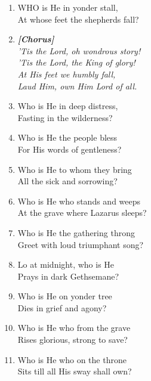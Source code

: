 \documentclass[11pt,a4paper]{article}
\begin{document}
\begin{enumerate}
    \item WHO is He in yonder stall, \\
        At whose feet the shepherds fall?

    \item[] \vspace{0.4em}
    \textbf{\textit{[Chorus]}} \\
    \textit{'Tis the Lord, oh wondrous story!} \\
    \textit{'Tis the Lord, the King of glory!} \\
    \textit{At His feet we humbly fall,} \\
    \textit{Laud Him, own Him Lord of all.}
    \vspace{0.4em}

    \item Who is He in deep distress, \\
        Fasting in the wilderness?

    \item Who is He the people bless \\
        For His words of gentleness?

    \item Who is He to whom they bring \\
        All the sick and sorrowing?

    \item Who is He who stands and weeps \\
        At the grave where Lazarus sleeps?

    \item Who is He the gathering throng \\
        Greet with loud triumphant song?

    \item Lo at midnight, who is He \\
        Prays in dark Gethsemane?

    \item Who is He on yonder tree \\
        Dies in grief and agony?

    \item Who is He who from the grave \\
        Rises glorious, strong to save?

    \item Who is He who on the throne \\
        Sits till all His sway shall own?

\end{enumerate}
\end{document}

